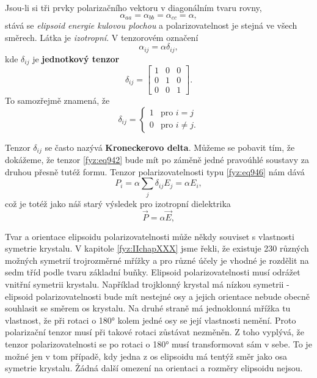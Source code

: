     Jsou-li si tři prvky polarizačního vektoru v diagonálním tvaru rovny,
    \begin{equation}\label{fyz:eq940}
        \alpha_{aa} = \alpha_{bb} = \alpha_{cc} = \alpha,
    \end{equation}
    stává se \emph{elipsoid energie kulovou plochou} a polarizovatelnost je stejná ve všech směrech.
    Látka je \emph{izotropní}. V tenzorovém označení
    \begin{equation}\label{fyz:eq946}
      \alpha_{ij} = \alpha\delta_{ij},
    \end{equation}
    kde \(\delta_{ij}\) je \textbf{jednotkový tenzor}
    \begin{equation}\label{fyz:eq942}
      \delta_{ij} = 
      \begin{bmatrix}
             1 & 0 & 0 \\
             0 & 1 & 0 \\
             0 & 0 & 1  
      \end{bmatrix}.
    \end{equation}
    To samozřejmě znamená, že
    \begin{equation}\label{fyz:eq943}
      \delta_{ij} = 
      \begin{cases} 
         1  & \text{pro } i = j     \\
         0  & \text{pro } i \neq j.
      \end{cases}
    \end{equation}

    Tenzor \(\delta_{ij}\) se často nazývá \textbf{Kroneckerovo delta}. Můžeme se pobavit tím, že
    dokážeme, že tenzor \eqref{fyz:eq942} bude mít po záměně jedné pravoúhlé soustavy za druhou
    přesně tutéž formu. Tenzor polarizovatelnosti typu \eqref{fyz:eq946} nám dává
    \begin{equation*}
      P_i = \alpha\sum_j\delta_{ij}E_j = \alpha E_i,
    \end{equation*}
    což je totéž jako náš starý výsledek pro izotropní dielektrika
    \begin{equation*}
      \vec{P} = \alpha\vec{E},
    \end{equation*}

    Tvar a orientace elipsoidu polarizovatelnosti může někdy souviset s vlastnosti symetrie
    krystalu. V kapitole \ref{fyz:IIchapXXX} jsme řekli, že existuje 230 různých možných symetrií
    trojrozměrné mřížky a pro různé účely je vhodné je rozdělit na sedm tříd podle tvaru základní
    buňky. Elipsoid polarizovatelnosti musí odrážet vnitřní symetrii krystalu. Například trojklonný
    krystal má nízkou symetrii - elipsoid polarizovatelnosti bude mít nestejné osy a jejich
    orientace nebude obecně souhlasit se směrem os krystalu. Na druhé straně má jednoklonná mřížka
    tu vlastnost, že při rotaci o \ang{180} kolem jedné osy se její vlastnosti nemění. Proto
    polarizační tenzor musí při takové rotaci zůstávat nezměněn. Z toho vyplývá, že tenzor
    polarizovatelnosti se po rotaci o \ang{180} musí transformovat sám v sebe. To je možné jen v tom
    případě, kdy jedna z os elipsoidu má tentýž směr jako osa symetrie krystalu. Žádná další omezení
    na orientaci a rozměry elipsoidu nejsou.
    
